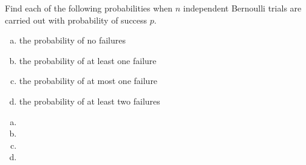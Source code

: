 \documentclass[../main.tex]{subfiles}
\begin{document}
Find each of the following probabilities when $n$ independent Bernoulli trials are carried out with probability of success $p$.
\begin{enumerate}[a)]
	\item the probability of no failures
	\item the probability of at least one failure
	\item the probability of at most one failure
	\item the probability of at least two failures
\end{enumerate}

\solution
\begin{enumerate}[a)]
	\item 
	\item 
	\item 
	\item 
\end{enumerate}
\end{document}
